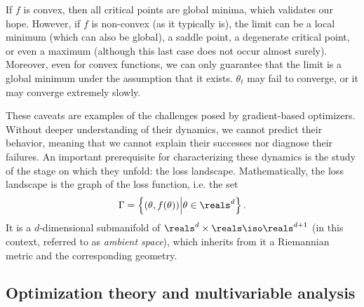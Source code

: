 If \(f\) is convex, then all critical points are global minima, which validates our hope.
However, if \(f\) is non-convex (as it typically is),
the limit can be a local minimum (which can also be global),
a saddle point, a degenerate critical point, or even a maximum
(although this last case does not occur almost surely).
Moreover, even for convex functions, we can only guarantee that the limit is a global minimum
under the assumption that it exists.
\(\theta_{t}\) may fail to converge, or it may converge extremely slowly.

These caveats are examples of the challenges posed by gradient-based optimizers.
Without deeper understanding of their dynamics, we cannot predict their behavior,
meaning that we cannot explain their successes nor diagnose their failures.
An important prerequisite for characterizing these dynamics
is the study of the stage on which they unfold: the loss landscape.
Mathematically, the loss landscape is the graph of the loss function,
i.e. the set
\[
	\Gamma = \left\{ \left( \theta, f(\theta) \right) \middle| \theta\in\reals^{d} \right\}.
\]
It is a \(d\)-dimensional submanifold of \(\reals^{d} \times \reals \iso \reals^{d+1}\)
(in this context, referred to as \emph{ambient space}),
which inherits from it a Riemannian metric and the corresponding geometry.


\subsection{Optimization theory and multivariable analysis}\label{sub:background:optimization}

